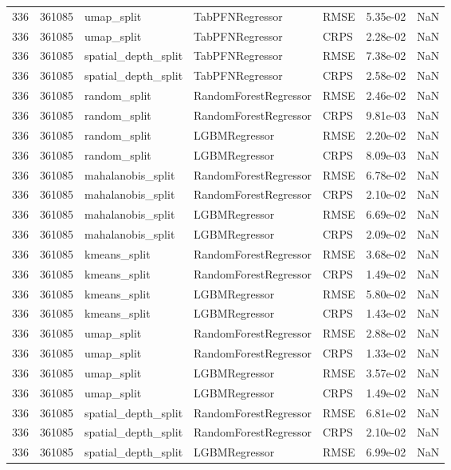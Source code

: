 \begin{tabular}{rrlllrr}
336 & 361085 & umap\_split & TabPFNRegressor & RMSE & 5.35e-02 & NaN \\
336 & 361085 & umap\_split & TabPFNRegressor & CRPS & 2.28e-02 & NaN \\
336 & 361085 & spatial\_depth\_split & TabPFNRegressor & RMSE & 7.38e-02 & NaN \\
336 & 361085 & spatial\_depth\_split & TabPFNRegressor & CRPS & 2.58e-02 & NaN \\
336 & 361085 & random\_split & RandomForestRegressor & RMSE & 2.46e-02 & NaN \\
336 & 361085 & random\_split & RandomForestRegressor & CRPS & 9.81e-03 & NaN \\
336 & 361085 & random\_split & LGBMRegressor & RMSE & 2.20e-02 & NaN \\
336 & 361085 & random\_split & LGBMRegressor & CRPS & 8.09e-03 & NaN \\
336 & 361085 & mahalanobis\_split & RandomForestRegressor & RMSE & 6.78e-02 & NaN \\
336 & 361085 & mahalanobis\_split & RandomForestRegressor & CRPS & 2.10e-02 & NaN \\
336 & 361085 & mahalanobis\_split & LGBMRegressor & RMSE & 6.69e-02 & NaN \\
336 & 361085 & mahalanobis\_split & LGBMRegressor & CRPS & 2.09e-02 & NaN \\
336 & 361085 & kmeans\_split & RandomForestRegressor & RMSE & 3.68e-02 & NaN \\
336 & 361085 & kmeans\_split & RandomForestRegressor & CRPS & 1.49e-02 & NaN \\
336 & 361085 & kmeans\_split & LGBMRegressor & RMSE & 5.80e-02 & NaN \\
336 & 361085 & kmeans\_split & LGBMRegressor & CRPS & 1.43e-02 & NaN \\
336 & 361085 & umap\_split & RandomForestRegressor & RMSE & 2.88e-02 & NaN \\
336 & 361085 & umap\_split & RandomForestRegressor & CRPS & 1.33e-02 & NaN \\
336 & 361085 & umap\_split & LGBMRegressor & RMSE & 3.57e-02 & NaN \\
336 & 361085 & umap\_split & LGBMRegressor & CRPS & 1.49e-02 & NaN \\
336 & 361085 & spatial\_depth\_split & RandomForestRegressor & RMSE & 6.81e-02 & NaN \\
336 & 361085 & spatial\_depth\_split & RandomForestRegressor & CRPS & 2.10e-02 & NaN \\
336 & 361085 & spatial\_depth\_split & LGBMRegressor & RMSE & 6.99e-02 & NaN \\

\end{tabular}
